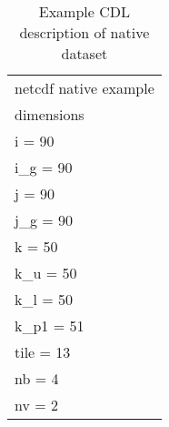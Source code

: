 \begin{longtable}{|p{\textwidth}|}
\caption{Example CDL description of native dataset}
\label{tab:cdl-native} \\
\hline \endhead
\hline \endfoot
netcdf native example\\
dimensions\\
\hline
\rowcolor{YellowGreen}  i = 90\\
\rowcolor{YellowGreen}  i\_g = 90\\
\rowcolor{YellowGreen}  j = 90\\
\rowcolor{YellowGreen}  j\_g = 90\\
\rowcolor{YellowGreen}  k = 50\\
\rowcolor{YellowGreen}  k\_u = 50\\
\rowcolor{YellowGreen}  k\_l = 50\\
\rowcolor{YellowGreen}  k\_p1 = 51\\
\rowcolor{YellowGreen}  tile = 13\\
\rowcolor{YellowGreen}  nb = 4\\
\rowcolor{YellowGreen}  nv = 2\\
\hline


\end{longtable}
